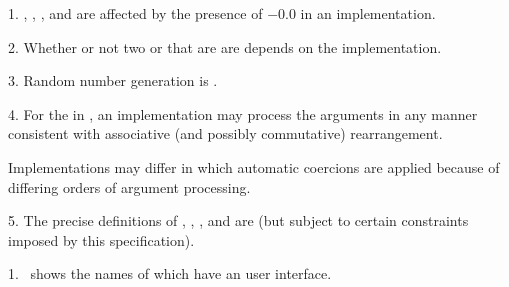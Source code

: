 \beginlist
\item{1.} 
  , , , and 
  are affected by the presence of {\tt $-0.0$} in an implementation.

\item{2.}
  Whether or not two  or 
  that are  are  depends on the implementation.


\item{3.} Random number generation is .


\item{4.} For the  in \thenextfigure,
an implementation may process the arguments in any manner consistent
with associative (and possibly commutative) rearrangement.


Implementations may differ in 
which automatic coercions are applied because of differing
orders of argument processing. 

\item{5.} 
The precise definitions of ,
, , and 
 are 
(but subject to certain constraints imposed by this specification).

\endlist
\endsubSection%


\beginlist
\item{1.}
\Thenextfigure\ shows the names of  which have
an  user interface.


